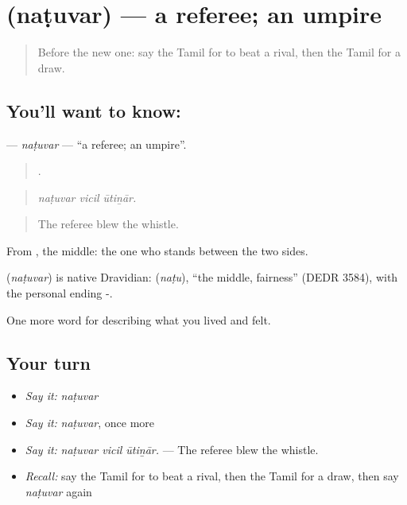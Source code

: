 \section[\texorpdfstring{\ta{நடுவர்} (naṭuvar)}{நடுவர் (naṭuvar)}]{ (naṭuvar) — a referee; an umpire}

\label{lesson:TA-C534-natuvar}



\begin{quote}
Before the new one: say the Tamil for to beat a rival, then the Tamil for a draw.
\end{quote}

\subsection*{You'll want to know: }
\textbf{} — \emph{naṭuvar} — \textquotedblleft{}a referee; an umpire\textquotedblright{}.

\begin{quote}
  .
\end{quote}

\begin{quote}
\emph{naṭuvar vicil ūtiṉār.}
\end{quote}

\begin{quote}
The referee blew the whistle.
\end{quote}

From , the middle: the one who stands between the two sides.

\begin{cousinweb}
\textbf{} (\emph{naṭuvar}) is native Dravidian:  (\emph{naṭu}), \textquotedblleft{}the middle, fairness\textquotedblright{} (DEDR 3584), with the personal ending -.
\end{cousinweb}

\begin{grammarlens}[title={What you've built}]
One more word for describing what you lived and felt.
\end{grammarlens}

\subsection*{Your turn}
\begin{itemize}
\raggedright
  \item \emph{Say it:} \emph{naṭuvar}
  \item \emph{Say it:} \emph{naṭuvar}, once more
  \item \emph{Say it:} \emph{naṭuvar vicil ūtiṉār.} — The referee blew the whistle.
  \item \emph{Recall:} say the Tamil for to beat a rival, then the Tamil for a draw, then say \emph{naṭuvar} again
\end{itemize}

